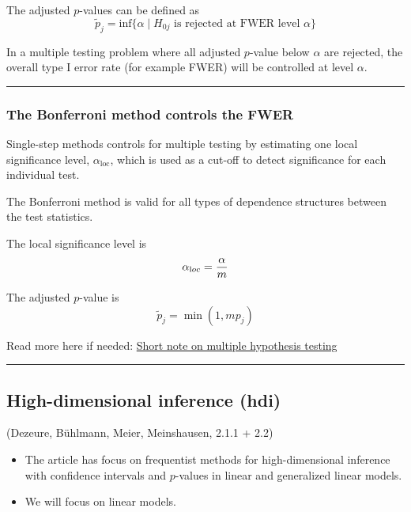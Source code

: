 \documentclass[
  letterpaper,
  DIV=11,
  numbers=noendperiod]{scrartcl}
\providecommand{\tightlist}{%
  \setlength{\itemsep}{0pt}\setlength{\parskip}{0pt}}\usepackage{longtable,booktabs,array}
\begin{document}
The adjusted \(p\)-values can be defined as
\[\tilde{p}_j = \text{inf}\{\alpha  \mid H_{0j}\text{ is rejected at FWER level } \alpha \}\]

In a multiple testing problem where all adjusted \(p\)-value below
\(\alpha\) are rejected, the overall type I error rate (for example
FWER) will be controlled at level \(\alpha\).

\begin{center}\rule{0.5\linewidth}{0.5pt}\end{center}

\hypertarget{the-bonferroni-method-controls-the-fwer}{%
\subsubsection{The Bonferroni method controls the
FWER}\label{the-bonferroni-method-controls-the-fwer}}

Single-step methods controls for multiple testing by estimating one
local significance level, \(\alpha_{\text{loc}}\), which is used as a
cut-off to detect significance for each individual test.

The Bonferroni method is valid for all types of dependence structures
between the test statistics.

The local significance level is \[\alpha_{\text loc}=\frac{\alpha}{m}\]

The adjusted \(p\)-value is \[ \tilde{p}_j =\min(1,m p_j)\]

Read more here if needed:
\href{https://www.math.ntnu.no/emner/TMA4267/2017v/multtest.pdf}{Short
note on multiple hypothesis testing}

\begin{center}\rule{0.5\linewidth}{0.5pt}\end{center}

\hypertarget{high-dimensional-inference-hdi}{%
\subsection{High-dimensional inference
(hdi)}\label{high-dimensional-inference-hdi}}

(Dezeure, Bühlmann, Meier, Meinshausen, 2.1.1 + 2.2)

\begin{itemize}
\tightlist
\item
  The article has focus on frequentist methods for high-dimensional
  inference with confidence intervals and \(p\)-values in linear and
  generalized linear models.
\item
  We will focus on linear models.
\end{itemize}
\end{document}
